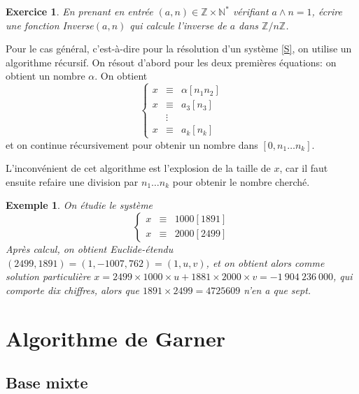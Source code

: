 \documentclass[12pt]{report}
\newtheorem*{ex}{Exemple}
\newtheorem*{exo}{Exercice}
\begin{document}
\begin{exo}
En prenant en entrée $(a,n)\in \mathbb{Z}\times \mathbb{N}^*$ vérifiant $a \wedge n=1$, écrire une fonction Inverse$(a,n)$ qui calcule l'inverse de $a$ dans $\mathbb{Z}/n \mathbb{Z}$.
\end{exo}


Pour le cas général, c'est-à-dire pour la résolution d'un système \eqref{S}, on utilise un algorithme récursif. On résout d'abord pour les deux premières équations: on obtient un nombre $\alpha$. On obtient
\begin{equation*}
\left \{ \begin{array}{ccc}
x & \equiv & \alpha [n_1 n_2] \\
x & \equiv & a_3 [n_3] \\
  &      \vdots    &   \\
x & \equiv & a_k [n_k]   
\end{array}   \right.
\end{equation*}
et on continue récursivement pour obtenir un nombre dans $[0, n_1 \ldots n_k]$.\par 
L'inconvénient de cet algorithme est l'explosion de la taille de $x$, car il faut ensuite refaire une division par $n_1 \ldots n_k$ pour obtenir le nombre cherché.

\begin{ex}
On étudie le système
\begin{equation}\label{Ex}
\left \{ \begin{array}{ccc}
x & \equiv &  1000 [1891] \\
x & \equiv & 2000 [2499]
\end{array}   \right.
\end{equation}
Après calcul, on obtient Euclide-étendu$(2499,1891)=(1,-1007,762)=(1,u,v)$, et on obtient alors comme solution particulière $x = 2499 \times 1000 \times u + 1881 \times 2000 \times v= -1\ 904\ 236\ 000$, qui comporte dix  chiffres, alors que $1891 \times 2499= 4725609 $  n'en a que sept.
\end{ex}


\section{Algorithme de Garner}

\subsection{Base mixte}

\end{document}
